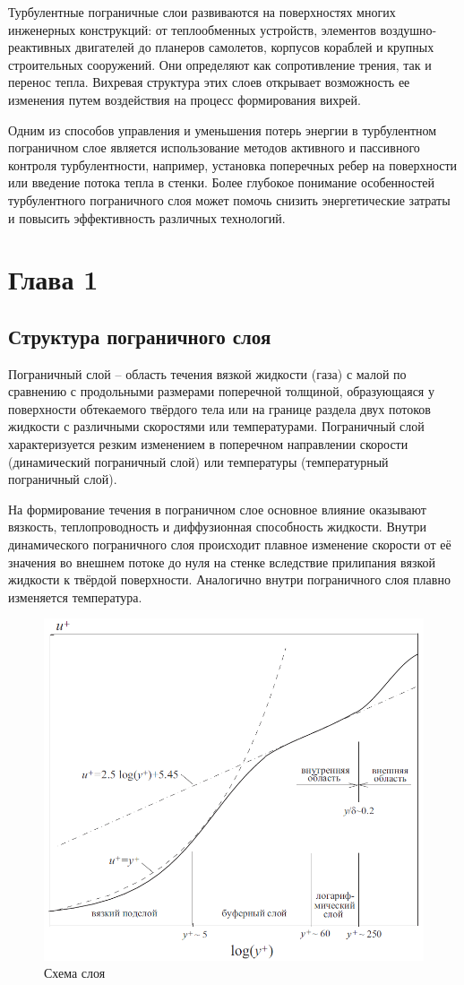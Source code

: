 \documentclass[a4paper]{article}
\newcommand{\numsection}[1]{\section*{#1}\addcontentsline{toc}{section}{#1} \refstepcounter{section}}
\begin{document}
		Турбулентные пограничные слои развиваются на поверхностях многих инженерных конструкций: от теплообменных устройств, элементов воздушно-реактивных двигателей до планеров самолетов, корпусов кораблей и крупных строительных сооружений. Они определяют как сопротивление трения, так и перенос тепла. Вихревая структура этих слоев открывает возможность ее изменения путем воздействия на процесс формирования вихрей. 
		
		Одним из способов управления и уменьшения потерь энергии в турбулентном пограничном слое является использование методов активного и пассивного контроля турбулентности, например, установка поперечных ребер на поверхности или введение потока тепла в стенки. Более глубокое понимание особенностей турбулентного пограничного слоя может помочь снизить энергетические затраты и повысить эффективность различных технологий.
		\newpage
	\numsection{Глава 1}
	\subsection{Структура пограничного слоя}
		Пограничный слой -- область течения вязкой жидкости (газа) с малой по сравнению с продольными размерами поперечной толщиной, образующаяся у поверхности обтекаемого твёрдого тела или на границе раздела двух потоков жидкости с различными скоростями или температурами. Пограничный слой характеризуется резким изменением в поперечном направлении скорости (динамический пограничный слой) или температуры (температурный пограничный слой).
		
		На формирование течения в пограничном слое основное влияние оказывают вязкость, теплопроводность и диффузионная способность жидкости. Внутри динамического пограничного слоя происходит плавное изменение скорости от её значения во внешнем потоке до нуля на стенке вследствие прилипания вязкой жидкости к твёрдой поверхности. Аналогично внутри пограничного слоя плавно изменяется температура.\\		
	\begin{figure}[H]
		\centering
		\includegraphics[width=0.7\linewidth]{../Assets/ПогранСлой}
		\caption{Схема слоя}
	\end{figure}
		
\end{document}
